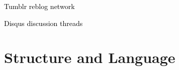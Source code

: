 \documentclass{beamer}
\begin{document}
{
\begin{frame}
\textcolor{black} {
\vfill \hfill \Large Tumblr reblog network}
\end{frame}
}

{
\begin{frame}
\textcolor{black} {
\vfill \hfill \Large Disqus discussion threads}
\end{frame}
}

\section{Structure and Language}
{
\begin{frame}
\textcolor{black} {
\hfill \Huge \insertsection}
\end{frame}
}
\end{document}

